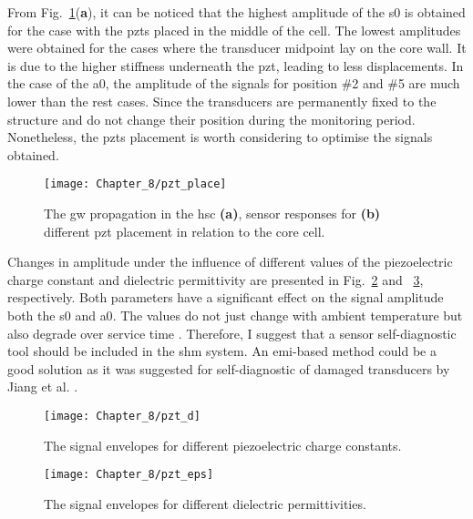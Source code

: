 From Fig.~\ref{fig:pzt_place}(\textbf{a}), it can be noticed that the highest amplitude of the \ac{s0} is obtained for the case with the \acp{pzt} placed in the middle of the cell.
The lowest amplitudes were obtained for the cases where the transducer midpoint lay on the core wall.
It is due to the higher stiffness underneath the \ac{pzt}, leading to less displacements.
In the case of the \ac{a0}, the amplitude of the signals for position \#2 and \#5 are much lower than the rest cases.
Since the transducers are permanently fixed to the structure and do not change their position during the monitoring period.
Nonetheless, the \acp{pzt} placement is worth considering to optimise the signals obtained.
\begin{figure}
	\begin{center}
		\texttt{[image: Chapter\_8/pzt\_place]}
	\end{center}
	\caption{The \acf{gw} propagation in the \acf{hsc} \textbf{(a)}, sensor responses for \textbf{(b)} different \acf{pzt} placement in relation to the core cell.}
	\label{fig:pzt_place}
\end{figure}

Changes in amplitude under the influence of different values of the piezoelectric charge constant and dielectric permittivity are presented in Fig.~\ref{fig:pzt_d} and ~\ref{fig:pzt_eps}, respectively.
Both parameters have a significant effect on the signal amplitude both the \ac{s0} and \ac{a0}.
The values do not just change with ambient temperature but also degrade over service time \cite{barzegar2001aging, deangelis2006p2o}.
Therefore, I suggest that a sensor self-diagnostic tool should be included in the \ac{shm} system. 
An \ac{emi}-based method could be a good solution as it was suggested for self-diagnostic of damaged transducers by Jiang et al. \cite{jiang2021electromechanical}.

\begin{figure}
	\begin{center}
		\texttt{[image: Chapter\_8/pzt\_d]}
	\end{center}
	\caption{The signal envelopes for different piezoelectric charge constants.}
	\label{fig:pzt_d}
\end{figure}

\begin{figure}
	\begin{center}
		\texttt{[image: Chapter\_8/pzt\_eps]}
	\end{center}
	\caption{The signal envelopes for different dielectric permittivities.}
	\label{fig:pzt_eps}
\end{figure}

